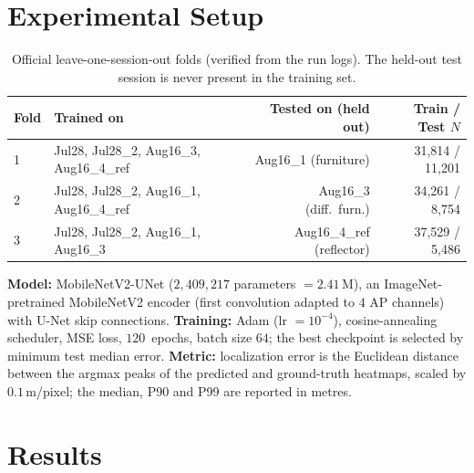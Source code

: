 \documentclass[11pt,a4paper]{article}
\begin{document}
\section{Experimental Setup}

\begin{table}[H]
\centering
\caption{Official leave-one-session-out folds (verified from the run logs). The held-out test
session is never present in the training set.}
\begin{tabular}{@{}llr r@{}}
\toprule
\textbf{Fold} & \textbf{Trained on} & \textbf{Tested on (held out)} & \textbf{Train / Test $N$} \\
\midrule
1 & Jul28, Jul28\_2, Aug16\_3, Aug16\_4\_ref & Aug16\_1 (furniture)      & 31{,}814 / 11{,}201 \\
2 & Jul28, Jul28\_2, Aug16\_1, Aug16\_4\_ref & Aug16\_3 (diff.\ furn.)   & 34{,}261 / 8{,}754  \\
3 & Jul28, Jul28\_2, Aug16\_1, Aug16\_3      & Aug16\_4\_ref (reflector) & 37{,}529 / 5{,}486  \\
\bottomrule
\end{tabular}
\end{table}

\noindent\textbf{Model:} MobileNetV2-UNet ($2{,}409{,}217$ parameters $=2.41$\,M), an
ImageNet-pretrained MobileNetV2 encoder (first convolution adapted to $4$ AP channels) with
U-Net skip connections. \textbf{Training:} Adam (lr $=10^{-4}$), cosine-annealing scheduler, MSE
loss, $120$~epochs, batch size $64$; the best checkpoint is selected by minimum test median
error. \textbf{Metric:} localization error is the Euclidean distance between the argmax peaks of
the predicted and ground-truth heatmaps, scaled by $0.1$\,m/pixel; the median, P90 and P99 are
reported in metres.

\section{Results}
\end{document}
